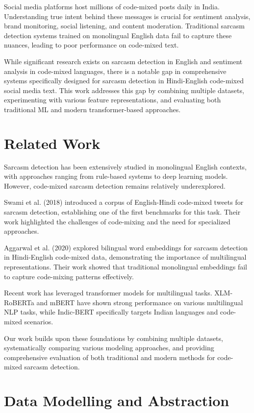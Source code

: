 \documentclass[11pt]{article}
\begin{document}
Social media platforms host millions of code-mixed posts daily in India. Understanding true intent behind these messages is crucial for sentiment analysis, brand monitoring, social listening, and content moderation. Traditional sarcasm detection systems trained on monolingual English data fail to capture these nuances, leading to poor performance on code-mixed text.

While significant research exists on sarcasm detection in English and sentiment analysis in code-mixed languages, there is a notable gap in comprehensive systems specifically designed for sarcasm detection in Hindi-English code-mixed social media text. This work addresses this gap by combining multiple datasets, experimenting with various feature representations, and evaluating both traditional ML and modern transformer-based approaches.

\section{Related Work}

Sarcasm detection has been extensively studied in monolingual English contexts, with approaches ranging from rule-based systems to deep learning models. However, code-mixed sarcasm detection remains relatively underexplored.

Swami et al. (2018) introduced a corpus of English-Hindi code-mixed tweets for sarcasm detection, establishing one of the first benchmarks for this task. Their work highlighted the challenges of code-mixing and the need for specialized approaches.

Aggarwal et al. (2020) explored bilingual word embeddings for sarcasm detection in Hindi-English code-mixed data, demonstrating the importance of multilingual representations. Their work showed that traditional monolingual embeddings fail to capture code-mixing patterns effectively.

Recent work has leveraged transformer models for multilingual tasks. XLM-RoBERTa and mBERT have shown strong performance on various multilingual NLP tasks, while Indic-BERT specifically targets Indian languages and code-mixed scenarios.

Our work builds upon these foundations by combining multiple datasets, systematically comparing various modeling approaches, and providing comprehensive evaluation of both traditional and modern methods for code-mixed sarcasm detection.

\section{Data Modelling and Abstraction}
\end{document}
